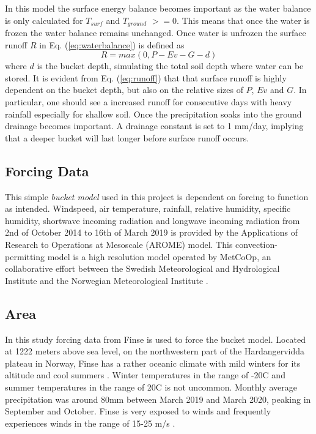 \documentclass[a4paper,11pt,twocolumn]{article}
\begin{document}
In this model the surface energy balance becomes important as the water balance is only calculated for $T_{surf}$ and $T_{ground}$ $>=0$. This means that once the water is frozen the water balance remains unchanged. Once water is unfrozen the surface runoff $R$ in Eq. (\ref{eq:waterbalance}) is defined as
\begin{equation}
	R = max(0, P-Ev-G-d)
	\label{eq:runoff}
\end{equation}  
where $d$ is the bucket depth, simulating the total soil depth where water can be stored. It is evident from Eq. (\ref{eq:runoff}) that that surface runoff is highly dependent on the bucket depth, but also on the relative sizes of $P$, $Ev$ and $G$. In particular, one should see a increased runoff for consecutive days with heavy rainfall especially for shallow soil.  
Once the precipitation soaks into the ground drainage becomes important. A drainage constant is set to 1 mm/day, implying that a deeper bucket will last longer before surface runoff occurs. 

\subsection{Forcing Data}

This simple \textit{bucket model} used in this project is dependent on forcing to function as intended. Windspeed, air temperature, rainfall, relative humidity, specific humidity, shortwave incoming radiation and longwave incoming radiation from 2nd of October 2014 to 16th of March 2019 is provided by the Applications of Research to Operations at Mesoscale (AROME) model. This convection-permitting model is a high resolution model operated by MetCoOp, an collaborative effort between the Swedish Meteorological and Hydrological Institute and the Norwegian Meteorological Institute \cite{muller}. 

\subsection{Area}
In this study forcing data from Finse is used to force the bucket model. Located at 1222 meters above sea level, on the northwestern part of the Hardangervidda plateau in Norway, Finse has a rather oceanic climate with mild winters for its altitude and cool summers \cite{finse}. Winter temperatures in the range of -20\textdegree C and summer temperatures in the range of 20\textdegree C is not uncommon. Monthly average precipitation was around 80mm between March 2019 and March 2020, peaking in September and October. Finse is very exposed to winds and frequently experiences winds in the range of 15-25 m/s \cite{yr}. 
\end{document}
